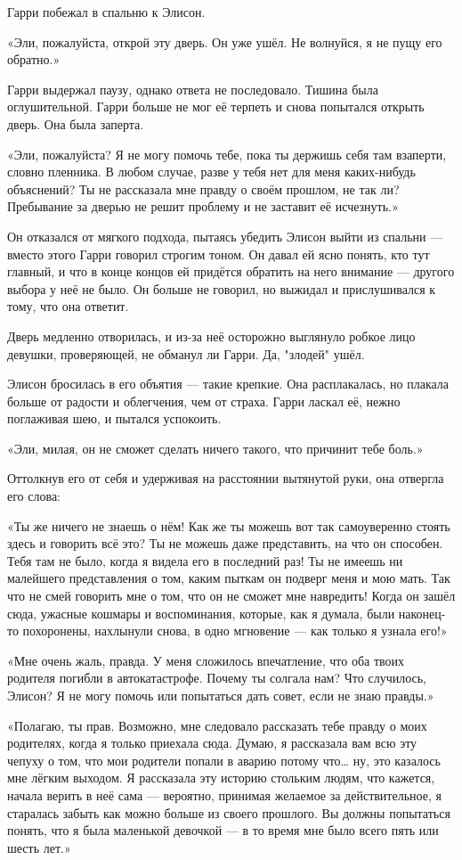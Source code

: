 \documentclass[a5paper, 9pt,
final, openany, twoside=true]{memoir}
\begin{document}
Гарри побежал в спальню к Элисон.

«Эли, пожалуйста, открой эту дверь. Он уже ушёл. Не волнуйся, я не пущу его обратно.»

Гарри выдержал паузу, однако ответа не последовало. Тишина была оглушительной. Гарри больше не мог её терпеть и снова попытался открыть дверь. Она была заперта.

«Эли, пожалуйста? Я не могу помочь тебе, пока ты держишь себя там взаперти, словно пленника. В любом случае, разве у тебя нет для меня каких-нибудь объяснений? Ты не рассказала мне правду о своём прошлом, не так ли? Пребывание за дверью не решит проблему и не заставит её исчезнуть.»

Он отказался от мягкого подхода, пытаясь убедить Элисон выйти из спальни — вместо этого Гарри говорил строгим тоном. Он давал ей ясно понять, кто тут главный, и что в конце концов ей придётся обратить на него внимание — другого выбора у неё не было. Он больше не говорил, но выжидал и прислушивался к тому, что она ответит.

Дверь медленно отворилась, и из-за неё осторожно выглянуло робкое лицо девушки, проверяющей, не обманул ли Гарри. Да, "злодей" ушёл.

Элисон бросилась в его объятия — такие крепкие. Она расплакалась, но плакала больше от радости и облегчения, чем от страха. Гарри ласкал её, нежно поглаживая шею, и пытался успокоить.

«Эли, милая, он не сможет сделать ничего такого, что причинит тебе боль.»

Оттолкнув его от себя и удерживая на расстоянии вытянутой руки, она отвергла его слова:

«Ты же ничего не знаешь о нём! Как же ты можешь вот так самоуверенно стоять здесь и говорить всё это? Ты не можешь даже представить, на что он способен. Тебя там не было, когда я видела его в последний раз! Ты не имеешь ни малейшего представления о том, каким пыткам он подверг меня и мою мать. Так что не смей говорить мне о том, что он не сможет мне навредить! Когда он зашёл сюда, ужасные кошмары и воспоминания, которые, как я думала, были наконец-то похоронены, нахлынули снова, в одно мгновение — как только я узнала его!»

«Мне очень жаль, правда. У меня сложилось впечатление, что оба твоих родителя погибли в автокатастрофе. Почему ты солгала нам? Что случилось, Элисон? Я не могу помочь или попытаться дать совет, если не знаю правды.»

«Полагаю, ты прав. Возможно, мне следовало рассказать тебе правду о моих родителях, когда я только приехала сюда. Думаю, я рассказала вам всю эту чепуху о том, что мои родители попали в аварию потому что… ну, это казалось мне лёгким выходом. Я рассказала эту историю стольким людям, что кажется, начала верить в неё сама — вероятно, принимая желаемое за действительное, я старалась забыть как можно больше из своего прошлого. Вы должны попытаться понять, что я была маленькой девочкой — в то время мне было всего пять или шесть лет.»
\end{document}
